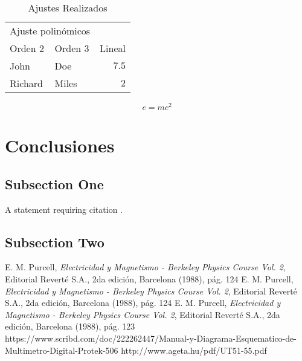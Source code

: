 \documentclass[twoside,twocolumn,a4paper]{article}
\begin{document}
\blindtext %

\begin{table}
\caption{Ajustes Realizados}
\centering
\begin{tabular}{llr}
\toprule
\multicolumn{2}{c}{Ajuste polin\'omicos} \\
\cmidrule(r){1-2}
Orden 2 & Orden 3 & Lineal\\
\midrule
John & Doe & $7.5$ \\
Richard & Miles & $2$ \\
\bottomrule
\end{tabular}
\end{table}


\begin{equation}
\label{eq:emc}
e = mc^2
\end{equation}

\blindtext %


\section{Conclusiones}

\subsection{Subsection One}

A statement requiring citation \cite{Figueredo:2009dg}.
\blindtext %

\subsection{Subsection Two}

\blindtext %


\begin{thebibliography}{99} %

 E. M. Purcell, \textit{Electricidad y Magnetismo - Berkeley Physics Course Vol. 2}, Editorial Revert\'e S.A., 2da edici\'on, Barcelona (1988), p\'ag. 124
 E. M. Purcell, \textit{Electricidad y Magnetismo - Berkeley Physics Course Vol. 2}, Editorial Revert\'e S.A., 2da edici\'on, Barcelona (1988), p\'ag. 124
 E. M. Purcell, \textit{Electricidad y Magnetismo - Berkeley Physics Course Vol. 2}, Editorial Revert\'e S.A., 2da edici\'on, Barcelona (1988), p\'ag. 123
 https://www.scribd.com/doc/222262447/Manual-y-Diagrama-Esquematico-de-Multimetro-Digital-Protek-506
 http://www.ageta.hu/pdf/UT51-55.pdf
 
\end{thebibliography}

\end{document}
